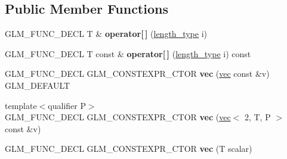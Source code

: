 \subsection*{Public Member Functions}
\begin{DoxyCompactItemize}
\item 
\mbox{\label{structglm_1_1vec_3_012_00_01T_00_01Q_01_4_abfa1d6705c2f4956cb7beccc917de27d}} 
G\+L\+M\+\_\+\+F\+U\+N\+C\+\_\+\+D\+E\+CL T \& {\bfseries operator\mbox{[}$\,$\mbox{]}} (\hyperlink{structglm_1_1vec_3_012_00_01T_00_01Q_01_4_af8b652526ec88c8513b2a8c05bf92441}{length\+\_\+type} i)
\item 
\mbox{\label{structglm_1_1vec_3_012_00_01T_00_01Q_01_4_ac475335b291db6f155d9d8f4ab3b6373}} 
G\+L\+M\+\_\+\+F\+U\+N\+C\+\_\+\+D\+E\+CL T const  \& {\bfseries operator\mbox{[}$\,$\mbox{]}} (\hyperlink{structglm_1_1vec_3_012_00_01T_00_01Q_01_4_af8b652526ec88c8513b2a8c05bf92441}{length\+\_\+type} i) const
\item 
\mbox{\label{structglm_1_1vec_3_012_00_01T_00_01Q_01_4_ad1785b216e3d6fa5f833c4cd58863cc4}} 
G\+L\+M\+\_\+\+F\+U\+N\+C\+\_\+\+D\+E\+CL G\+L\+M\+\_\+\+C\+O\+N\+S\+T\+E\+X\+P\+R\+\_\+\+C\+T\+OR {\bfseries vec} (\hyperlink{structglm_1_1vec}{vec} const \&v) G\+L\+M\+\_\+\+D\+E\+F\+A\+U\+LT
\item 
\mbox{\label{structglm_1_1vec_3_012_00_01T_00_01Q_01_4_a7eb23dcef5e913dc1e07d004db53d201}} 
{\footnotesize template$<$qualifier P$>$ }\\G\+L\+M\+\_\+\+F\+U\+N\+C\+\_\+\+D\+E\+CL G\+L\+M\+\_\+\+C\+O\+N\+S\+T\+E\+X\+P\+R\+\_\+\+C\+T\+OR {\bfseries vec} (\hyperlink{structglm_1_1vec}{vec}$<$ 2, T, P $>$ const \&v)
\item 
\mbox{\label{structglm_1_1vec_3_012_00_01T_00_01Q_01_4_a638fde20902e4e7546f71dfad919a17f}} 
G\+L\+M\+\_\+\+F\+U\+N\+C\+\_\+\+D\+E\+CL G\+L\+M\+\_\+\+C\+O\+N\+S\+T\+E\+X\+P\+R\+\_\+\+C\+T\+OR {\bfseries vec} (T scalar)
\item 
\mbox{\label{structglm_1_1vec_3_012_00_01T_00_01Q_01_4_a283bdd9caea39778ed8ff4717b904718}} 

\end{DoxyCompactItemize}
